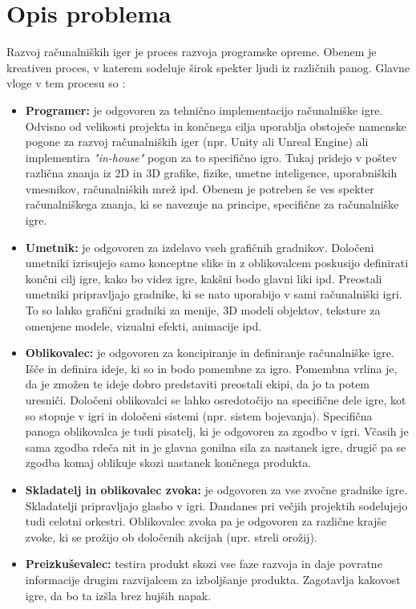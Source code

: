 \documentclass[12pt,a4paper,twoside]{book}
\begin{document}
\section{Opis problema}
\label{sec:opis_problema}
Razvoj računalniških iger je proces razvoja programske opreme. Obenem je kreativen proces, v katerem sodeluje širok spekter ljudi iz različnih panog. Glavne vloge v tem procesu so \cite{rogers2014level}:
\begin{itemize}
	\item \textbf{Programer:} je odgovoren za tehnično implementacijo računalniške igre. Odvisno od velikosti projekta in končnega cilja uporablja obstoječe namenske pogone za razvoj računalniških iger (npr. Unity ali Unreal Engine) ali implementira \textit{"in-house"} pogon za to specifično igro. Tukaj pridejo v poštev različna znanja iz 2D in 3D grafike, fizike, umetne inteligence, uporabniških vmesnikov, računalniških mrež ipd. Obenem je potreben še ves spekter računalniškega znanja, ki se navezuje na principe, specifične za računalniške igre.
	\item \textbf{Umetnik:} je odgovoren za izdelavo vseh grafičnih gradnikov. Določeni umetniki izrisujejo samo konceptne slike in z oblikovalcem poskusijo definirati končni cilj igre, kako bo videz igre, kakšni bodo glavni liki ipd. Preostali umetniki pripravljajo gradnike, ki se nato uporabijo v sami računalniški igri. To so lahko grafični gradniki za menije, 3D modeli objektov, teksture za omenjene modele, vizualni efekti, animacije ipd.
	\item \textbf{Oblikovalec:} je odgovoren za koncipiranje in definiranje računalniške igre. Išče in definira ideje, ki so in bodo pomembne za igro. Pomembna vrlina je, da je zmožen te ideje dobro predstaviti preostali ekipi, da jo ta potem uresniči. Določeni oblikovalci se lahko osredotočijo na specifične dele igre, kot so stopnje v igri in določeni sistemi (npr. sistem bojevanja).
	Specifična panoga oblikovalca je tudi pisatelj, ki je odgovoren za zgodbo v igri. Včasih je sama zgodba rdeča nit in je glavna gonilna sila za nastanek igre, drugič pa se zgodba komaj oblikuje skozi nastanek končnega produkta.
	\item \textbf{Skladatelj in oblikovalec zvoka:} je odgovoren za vse zvočne gradnike igre. Skladatelji pripravljajo glasbo v igri. Dandanes pri večjih projektih sodelujejo tudi celotni orkestri. Oblikovalec zvoka pa je odgovoren za različne krajše zvoke, ki se prožijo ob določenih akcijah (npr. streli orožij).
	\item \textbf{Preizkuševalec:} testira produkt skozi vse faze razvoja in daje povratne informacije drugim razvijalcem za izboljšanje produkta. Zagotavlja kakovost igre, da bo ta izšla brez hujših napak.
\end{itemize}
\end{document}
